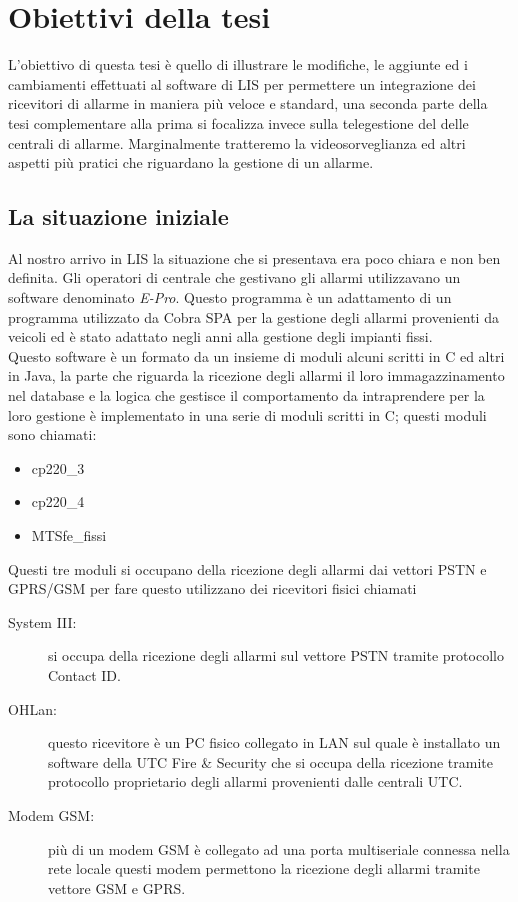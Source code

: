\chapter{Obiettivi della tesi}
\label{capitolo3}
\thispagestyle{empty}

L'obiettivo di questa tesi è quello di illustrare le modifiche, le aggiunte ed i cambiamenti effettuati al software di LIS per permettere un integrazione dei ricevitori di allarme in maniera più veloce e standard, una seconda parte della tesi complementare alla prima si focalizza invece sulla telegestione del delle centrali di allarme. Marginalmente tratteremo la videosorveglianza ed altri aspetti più pratici che riguardano la gestione di un allarme.
\section{La situazione iniziale}
Al nostro arrivo in LIS la situazione che si presentava era poco chiara e non ben definita. Gli operatori di centrale che gestivano gli allarmi utilizzavano un software denominato \emph{E-Pro}. Questo programma è un adattamento di un programma utilizzato da Cobra SPA per la gestione degli allarmi provenienti da veicoli ed è stato adattato  negli anni alla gestione degli impianti fissi.\\
Questo software è un formato da un insieme di moduli alcuni scritti in C ed altri in Java, la parte che riguarda la ricezione degli allarmi il loro immagazzinamento nel database e la logica che gestisce il comportamento da intraprendere per la loro gestione è implementato in una serie di moduli scritti in C; questi moduli sono chiamati:
\begin{itemize}
	\item cp220\_3
	\item cp220\_4
	\item MTSfe\_fissi
\end{itemize}
Questi tre moduli si occupano della ricezione degli allarmi dai vettori PSTN e GPRS/GSM per fare questo utilizzano dei ricevitori fisici chiamati
\begin{description}
	\item[System III:] si occupa della ricezione degli allarmi sul vettore PSTN tramite protocollo Contact ID.
	\item[OHLan:] questo ricevitore è un PC fisico collegato in LAN sul quale è installato un software della UTC Fire \& Security che si occupa della ricezione tramite protocollo proprietario degli allarmi provenienti dalle centrali UTC.
	\item[Modem GSM:] più di un modem GSM è collegato ad una porta multiseriale connessa nella rete locale questi modem permettono la ricezione degli allarmi tramite vettore GSM e GPRS.
\end{description}

